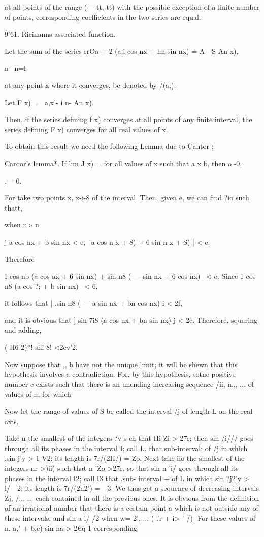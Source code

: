 at all points of the range (— tt, tt) with the possible exception of a
finite number of points, corresponding coefficients in the two series
are equal.

9'61. Rieinanns associated function.

Let the sum of the series rrOa + 2 (a,i cos nx + hn sin nx) = A - S An
x),

  n-\ n=l

at any point x where it converges, be denoted by /(a;).

Let F x) = \ a,x'- i n- An x).

Then, if the series defining f x) converges at all points of any
finite interval, the series defining F x) converges for all real
values of x.

To obtain this result we need the following Lemma due to Cantor :

Cantor's lemma*. If lim J x) = for all values of x such that a x b,
then o -0,

 .— 0.

For take two points x, x-i-8 of the interval. Then, given e, we can
find ?io such thatt,

when n> n

j a cos nx + b sin nx < e, \ a cos n x + 8) + 6 sin n x + S) | < e.

Therefore

I cos nb (a cos ax + 6 sin nx) + sin n8 ( — sin nx + 6 cos nx) \ < e.
Since 1 cos n8 (a cos ?; + b sin nx) \ < 6,

it follows that | .sin n8 ( — a sin nx + bn cos nx) i < 2f,

and it is obvious that ] sin 7i8 (a cos nx + bn sin nx) j < 2c.
Therefore, squaring and adding,

( H6 2)*! siii 8! <2ev'2.

Now suppose that ,, b have not the unique limit; it will be shewn
that this hypothesis involves a contradiction. For, by this
hypothesis, sotne positive number e exists such that there is an
unending increasing sequence /ii, n.,, ... of values of n, for which

Now let the range of values of S be called the interval /j of length L
on the real axis.

Take n the smallest of the integers ?v s ch that Hi Zi > 27r; then
sin /i/// goes through all its phases in the interval I; call I.,
that sub-interval; of /j in which .sin j'y > 1 V2; its length is
7r/(2H/) = Zo. Next take iio the smallest of the integers nr >)ii)
such that n 'Zo >27r, so that sin n 'i/ goes through all its phases in
the interval I2; call I3 that .sub- interval + of L in which sin ?j2'y
> l/\ \ 2; its length is 7r/(2n2') = - 3. We thus get a sequence of
decreasing intervals Zj, /.,, ... each contained in all the previous
ones. It is obvious from the definition of an irrational number that
there is a certain point a which is not outside any of these
intervals, and sin a l/ /2 when w= 2', ... ( .'r + i> ' /)- For these
values of n, a,' + b,c) sin na > 2€q 1%
corresponding

